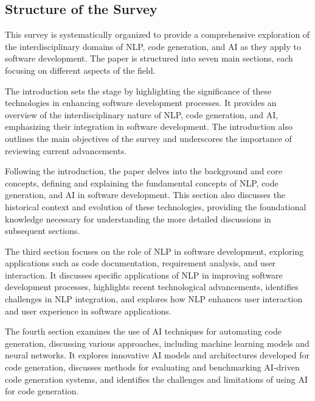 \subsection{Structure of the Survey} \label{subsec:Structure of the Survey}

This survey is systematically organized to provide a comprehensive exploration of the interdisciplinary domains of NLP, code generation, and AI as they apply to software development. The paper is structured into seven main sections, each focusing on different aspects of the field.



The introduction sets the stage by highlighting the significance of these technologies in enhancing software development processes. It provides an overview of the interdisciplinary nature of NLP, code generation, and AI, emphasizing their integration in software development. The introduction also outlines the main objectives of the survey and underscores the importance of reviewing current advancements.



Following the introduction, the paper delves into the background and core concepts, defining and explaining the fundamental concepts of NLP, code generation, and AI in software development. This section also discusses the historical context and evolution of these technologies, providing the foundational knowledge necessary for understanding the more detailed discussions in subsequent sections.



The third section focuses on the role of NLP in software development, exploring applications such as code documentation, requirement analysis, and user interaction. It discusses specific applications of NLP in improving software development processes, highlights recent technological advancements, identifies challenges in NLP integration, and explores how NLP enhances user interaction and user experience in software applications.



The fourth section examines the use of AI techniques for automating code generation, discussing various approaches, including machine learning models and neural networks. It explores innovative AI models and architectures developed for code generation, discusses methods for evaluating and benchmarking AI-driven code generation systems, and identifies the challenges and limitations of using AI for code generation.



